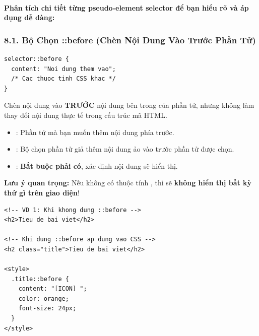 \paragraph{Phân tích chi tiết từng pseudo-element selector để bạn hiểu rõ và áp dụng dễ dàng:}

\subsubsection{8.1. Bộ Chọn ::before (Chèn Nội Dung Vào Trước Phần Tử)}

\begin{codeWindow}
\begin{lstlisting}[language=CSS3]
selector::before {
  content: "Noi dung them vao";
  /* Cac thuoc tinh CSS khac */
}
\end{lstlisting}
\end{codeWindow}

\begin{conceptBox}
Chèn nội dung vào \textbf{TRƯỚC} nội dung bên trong của phần tử, nhưng không làm thay đổi nội dung thực tế trong cấu trúc mã HTML.
\begin{itemize}[leftmargin=1.5em, itemsep=3pt, parsep=0pt]
    \item {}: Phần tử mà bạn muốn thêm nội dung phía trước.
    \item {}: Bộ chọn phần tử giả thêm nội dung ảo vào trước phần tử được chọn.
    \item {}: \textbf{Bắt buộc phải có}, xác định nội dung sẽ hiển thị.
\end{itemize}
\par\vspace{4pt}
\textbf{Lưu ý quan trọng:} Nếu không có thuộc tính , thì  sẽ \textbf{không hiển thị bất kỳ thứ gì trên giao diện}!
\end{conceptBox}

\begin{codeWindow}
\begin{lstlisting}[language=HTML5]
<!-- VD 1: Khi khong dung ::before -->
<h2>Tieu de bai viet</h2>

<!-- Khi dung ::before ap dung vao CSS -->
<h2 class="title">Tieu de bai viet</h2>

<style>
  .title::before {
    content: "[ICON] ";
    color: orange;
    font-size: 24px;
  }
</style>
\end{lstlisting}
\end{codeWindow}

